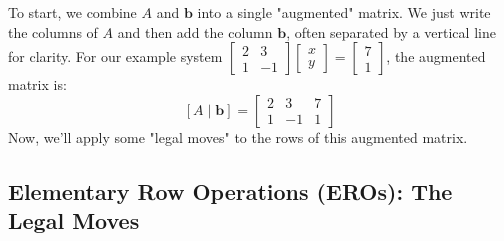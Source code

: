 \documentclass[11pt]{article}
\newcommand{\bb}{\mathbf{b}}
\begin{document}
To start, we combine $A$ and $\bb$ into a single "augmented" matrix. We just write the columns of $A$ and then add the column $\bb$, often separated by a vertical line for clarity.
For our example system $\begin{bmatrix} 2 & 3 \\ 1 & -1 \end{bmatrix} \begin{bmatrix} x \\ y \end{bmatrix} = \begin{bmatrix} 7 \\ 1 \end{bmatrix}$, the augmented matrix is:
\[ [A \mid \bb] = \left[ \begin{array}{cc|c} 2 & 3 & 7 \\ 1 & -1 & 1 \end{array} \right] \]
Now, we'll apply some "legal moves" to the rows of this augmented matrix.

\subsection{Elementary Row Operations (EROs): The Legal Moves}
\end{document}

